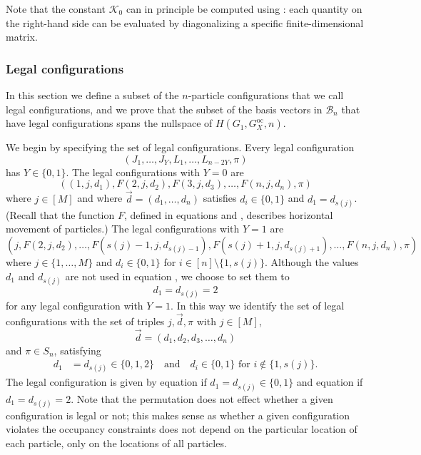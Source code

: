 \documentclass[../thesis-main/thesis-main]{subfiles}
\begin{document}
Note that the constant $\mathcal{K}_0$ can in principle be computed using : each quantity on the right-hand side can be evaluated by diagonalizing a specific finite-dimensional matrix.


\subsubsection{Legal configurations}\label{sec:legal_configurations}

In this section we define a subset of the $n$-particle configurations that we call legal configurations, and we prove that the subset of the basis vectors in $\mathcal{B}_{n}$ that have legal configurations spans the nullspace of $H(G_{1},G_X^{\text{oc}},n).$

We begin by specifying the set of legal configurations. Every legal configuration 
\begin{equation}
(J_{1},\ldots,J_{Y},L_{1},\ldots,L_{n-2Y},\pi)
\end{equation}
has $Y\in\{0,1\}$. The legal configurations with $Y=0$ are 
\begin{equation}
((1,j,d_{1}),F(2,j,d_{2}),F(3,j,d_{3}),\ldots,F(n,j,d_{n}),\pi)\label{eq:config_c01}
\end{equation}
where $j\in[M]$ and where $\vec{d}=\left(d_{1},\ldots,d_{n}\right)$ satisfies $d_{i}\in\{0,1\}$ and $d_{1}=d_{s(j)}$. (Recall that the function $F$, defined in equations  and , describes horizontal movement of particles.) The legal configurations with $Y=1$ are 
\begin{equation}
(j,F(2,j,d_{2}),\ldots,F(s(j)-1,j,d_{s(j)-1}),F(s(j)+1,j,d_{s(j)+1}),\ldots,F(n,j,d_{n}),\pi)\label{eq:config_2}
\end{equation}
where $j\in\{1,\ldots,M\}$ and $d_{i}\in\{0,1\}$ for $i\in[n]\setminus\{1,s(j)\}$. Although the values $d_{1}$ and $d_{s(j)}$ are not used in equation , we choose to set them to 
\begin{equation}
d_{1}=d_{s(j)}=2
\end{equation}
for any legal configuration with $Y=1$. In this way we identify the set of legal configurations with the set of triples $j,\vec{d},\pi$ with $j\in[M]$, 
\begin{equation}
\vec{d}=(d_{1},d_{2},d_{3},\ldots,d_{n})
\end{equation}
and $\pi\in S_n$, satisfying 
\begin{align}
d_{1} & =d_{s(j)}\in\{0,1,2\} \quad \text{and} \quad d_{i}\in\{0,1\} \text{ for } i\notin\{1,s(j)\}.
\end{align}
The legal configuration is given by equation  if $d_{1}=d_{s(j)}\in\{0,1\}$ and equation  if $d_{1}=d_{s(j)}=2$. Note that the permutation does not effect whether a given configuration is legal or not; this makes sense as whether a given configuration violates the occupancy constraints does not depend on the particular location of each particle, only on the locations of all particles.
\end{document}
